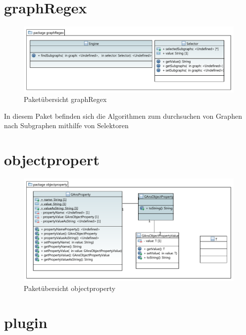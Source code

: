 \newpage

\section{graphRegex}

\begin{figure}[hb]
  \centering
  \includegraphics[width=380pt]{resourcen/graphRegex.pdf}
  \caption{Paketübersicht graphRegex}
  \label{fig:packge_graphRegex}
\end{figure}

In diesem Paket befinden sich die Algorithmen zum durchsuchen von Graphen nach Subgraphen mithilfe von Selektoren

\newpage

\section{objectpropert}

\begin{figure}[hb]
  \centering
  \includegraphics[width=380pt]{resourcen/objectproperty.pdf}
  \caption{Paketübersicht objectproperty}
  \label{fig:packge_objectproperty}
\end{figure}

\newpage

\section{plugin}


